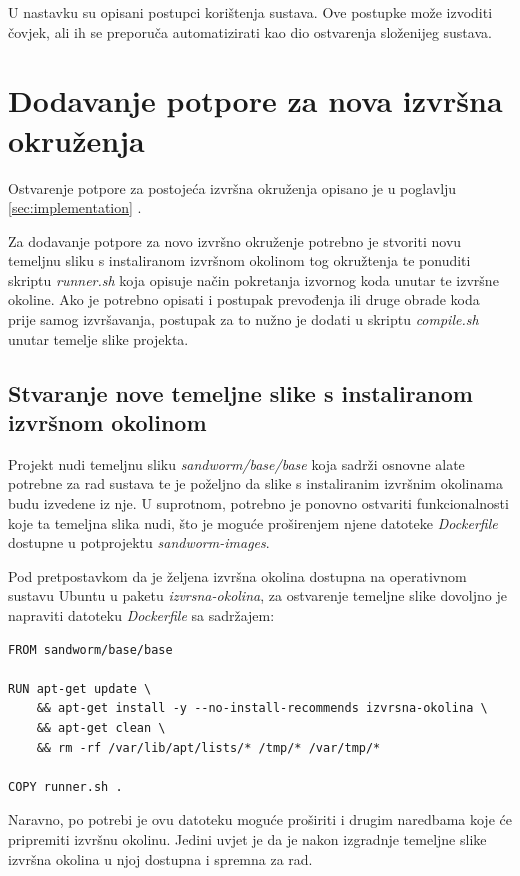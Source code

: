\documentclass[times, utf8, zavrsni]{fer}
\begin{document}
{{{\begin{appendices}
U nastavku su opisani postupci korištenja sustava. Ove postupke može izvoditi čovjek, ali ih se preporuča automatizirati kao dio ostvarenja složenijeg sustava.

\section{Dodavanje potpore za nova izvršna okruženja}

Ostvarenje potpore za postojeća izvršna okruženja opisano je u poglavlju \ref{sec:implementation} .

Za dodavanje potpore za novo izvršno okruženje potrebno je stvoriti novu temeljnu sliku s instaliranom izvršnom okolinom tog okružtenja te ponuditi skriptu {\textit{runner.sh}} koja opisuje način pokretanja izvornog koda unutar te izvršne okoline. Ako je potrebno opisati i postupak prevođenja ili druge obrade koda prije samog izvršavanja, postupak za to nužno je dodati u skriptu {\textit{compile.sh}} unutar temelje slike projekta.

\subsection{Stvaranje nove temeljne slike s instaliranom izvršnom okolinom}

Projekt nudi temeljnu sliku {\textit{sandworm/base/base}} koja sadrži osnovne alate potrebne za rad sustava te je poželjno da slike s instaliranim izvršnim okolinama budu izvedene iz nje. U suprotnom, potrebno je ponovno ostvariti funkcionalnosti koje ta temeljna slika nudi, što je moguće proširenjem njene datoteke {\textit{Dockerfile}} dostupne u potprojektu {\textit{sandworm-images}}.

Pod pretpostavkom da je željena izvršna okolina dostupna na operativnom sustavu Ubuntu u paketu {\textit{izvrsna-okolina}}, za ostvarenje temeljne slike dovoljno je napraviti datoteku {\textit{Dockerfile}} sa sadržajem:

\begin{lstlisting}
FROM sandworm/base/base

RUN apt-get update \
    && apt-get install -y --no-install-recommends izvrsna-okolina \
    && apt-get clean \
    && rm -rf /var/lib/apt/lists/* /tmp/* /var/tmp/*

COPY runner.sh .
\end{lstlisting}

Naravno, po potrebi je ovu datoteku moguće proširiti i drugim naredbama koje će pripremiti izvršnu okolinu. Jedini uvjet je da je nakon izgradnje temeljne slike izvršna okolina u njoj dostupna i spremna za rad.


\end{appendices}}}}
\end{document}
